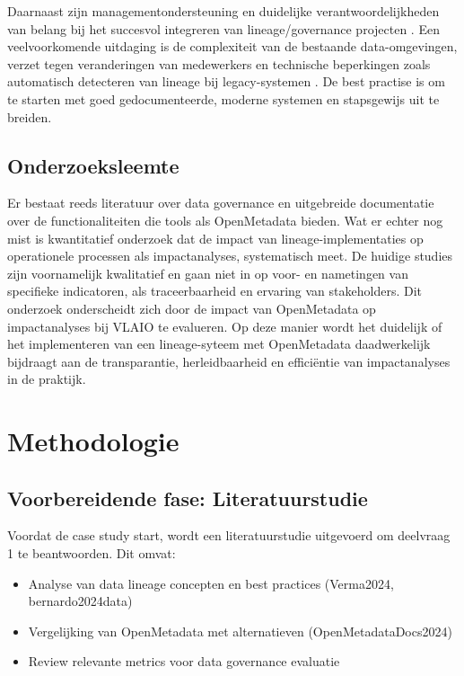 Daarnaast zijn managementondersteuning en duidelijke verantwoordelijkheden van belang bij het succesvol integreren van lineage/governance projecten \autocite{Dataversity2025}. Een veelvoorkomende uitdaging is de complexiteit van de bestaande data-omgevingen, verzet tegen veranderingen van medewerkers en technische beperkingen zoals automatisch detecteren van lineage bij legacy-systemen \autocite{Secoda2024}. De best practise is om te starten met goed gedocumenteerde, moderne systemen en stapsgewijs uit te breiden.

\subsection{Onderzoeksleemte}

Er bestaat reeds literatuur over data governance en uitgebreide documentatie over de functionaliteiten die tools als OpenMetadata bieden. Wat er echter nog mist is kwantitatief onderzoek dat de impact van lineage-implementaties op operationele processen als impactanalyses, systematisch meet. De huidige studies zijn voornamelijk kwalitatief en gaan niet in op voor- en nametingen van specifieke indicatoren, als traceerbaarheid en ervaring van stakeholders. Dit onderzoek onderscheidt zich door de impact van OpenMetadata op impactanalyses bij VLAIO te evalueren. Op deze manier wordt het duidelijk of het implementeren van een lineage-syteem met OpenMetadata daadwerkelijk bijdraagt aan de transparantie, herleidbaarheid en efficiëntie van impactanalyses in de praktijk.

\section{Methodologie}%
\label{sec:methodologie}

\subsection{Voorbereidende fase: Literatuurstudie}
Voordat de case study start, wordt een literatuurstudie uitgevoerd om deelvraag 1 te beantwoorden. Dit omvat:
\begin{itemize}
\item Analyse van data lineage concepten en best practices (Verma2024, bernardo2024data)
\item Vergelijking van OpenMetadata met alternatieven (OpenMetadataDocs2024)
\item Review relevante metrics voor data governance evaluatie
\end{itemize}

